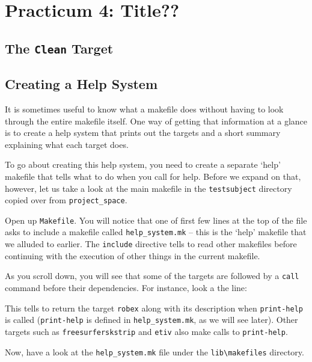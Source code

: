 \chapter*{Practicum 4: Title?? }
\label{sec:practicum4}

\section{The \texttt{Clean} Target}



\section{Creating a \maken{} Help System}
It is sometimes useful to know what a makefile does without having to look through the entire makefile itself. One way of getting that information at a glance is to create a \maken{} help system that prints out the targets and a short summary explaining what each target does. 

To go about creating this help system, you need to create a separate `help' makefile that tells \maken{} what to do when you call for help. Before we expand on that, however, let us take a look at the main makefile in the \texttt{testsubject} directory copied over from \texttt{project_space}.

Open up \texttt{Makefile}. You will notice that one of first few lines at the top of the file asks \maken{} to include a makefile called \texttt{help_system.mk} -- this is the `help' makefile that we alluded to earlier. The \texttt{include} directive tells \maken{} to read other makefiles before continuing with the execution of other things in the current makefile.  

As you scroll down, you will see that some of the targets are followed by a \texttt{call} command before their dependencies. For instance, look a the line:

This tells \maken{} to return the target \texttt{robex} along with its description when \texttt{print-help} is called (\texttt{print-help} is defined in \texttt{help_system.mk}, as we will see later). Other targets such as \texttt{freesurferskstrip} and \texttt{etiv} also make calls to \texttt{print-help}.

Now, have a look at the \texttt{help_system.mk} file under the \texttt{lib\textbackslash makefiles} directory.  

